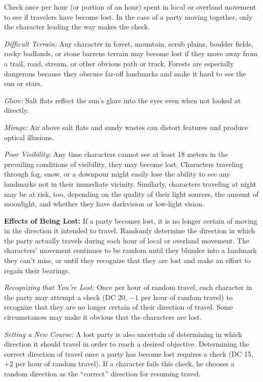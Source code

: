Check once per hour (or portion of an hour) spent in local or overland movement to see if travelers have become lost. In the case of a party moving together, only the character leading the way makes the check.

\textit{Difficult Terrain:} Any character in forest, mountain, scrub plains, boulder fields, rocky badlands, or stone barrens terrain may become lost if they move away from a trail, road, stream, or other obvious path or track. Forests are especially dangerous because they obscure far-off landmarks and make it hard to see the sun or stars.

\textit{Glare:} Salt flats reflect the sun's glare into the eyes even when not looked at directly.

\textit{Mirage:} Air above salt flats and sandy wastes can distort features and produce optical illusions.

\textit{Poor Visibility:} Any time characters cannot see at least 18 meters in the prevailing conditions of visibility, they may become lost. Characters traveling through fog, snow, or a downpour might easily lose the ability to see any landmarks not in their immediate vicinity. Similarly, characters traveling at night may be at risk, too, depending on the quality of their light sources, the amount of moonlight, and whether they have darkvision or low-light vision.


\textbf{Effects of Being Lost:} If a party becomes lost, it is no longer certain of moving in the direction it intended to travel. Randomly determine the direction in which the party actually travels during each hour of local or overland movement. The characters' movement continues to be random until they blunder into a landmark they can't miss, or until they recognize that they are lost and make an effort to regain their bearings.

\textit{Recognizing that You're Lost:} Once per hour of random travel, each character in the party may attempt a  check (DC 20, $-1$ per hour of random travel) to recognize that they are no longer certain of their direction of travel. Some circumstances may make it obvious that the characters are lost.

\textit{Setting a New Course:} A lost party is also uncertain of determining in which direction it should travel in order to reach a desired objective. Determining the correct direction of travel once a party has become lost requires a  check (DC 15, +2 per hour of random travel). If a character fails this check, he chooses a random direction as the ``correct'' direction for resuming travel.

